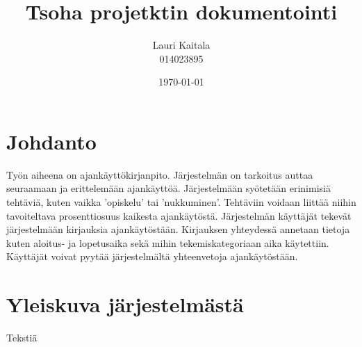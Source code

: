 \documentclass[12pt]{article}
\author{Lauri Kaitala \\ 014023895}
\title{\textbf{Tsoha projetktin dokumentointi}}
\date{\today}
\begin{document}
\maketitle

\section{Johdanto}

Työn aiheena on ajankäyttökirjanpito. Järjestelmän on tarkoitus auttaa seuraamaan ja erittelemään ajankäyttöä. Järjestelmään syötetään erinimisiä tehtäviä, kuten vaikka 'opiskelu' tai 'nukkuminen'. Tehtäviin voidaan liittää niihin tavoiteltava prosenttiosuus kaikesta ajankäytöstä. Järjestelmän käyttäjät tekevät järjestelmään kirjauksia ajankäytöstään. Kirjauksen yhteydessä annetaan tietoja kuten aloitus- ja lopetusaika sekä mihin tekemiskategoriaan aika käytettiin. Käyttäjät voivat pyytää järjestelmältä yhteenvetoja ajankäytöstään.

\section{Yleiskuva järjestelmästä}
Tekstiä
\end{document}
